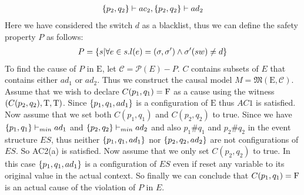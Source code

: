 \begin{example}
\begin{align*}
        \{p_2,q_2\} \vdash ac_2, \{p_2,q_2\} \vdash ad_2
    \end{align*}
    Here we have considered the switch $d$ as a blacklist, thus we can define the
    safety property $P$ as follows:
    \begin{align*}
        P = \{s|\forall e \in s. l(e) = (\sigma,\sigma')\wedge \sigma'(sw) \neq d\}
    \end{align*}
    To find the cause of $P$ in $\mathrm{E}$,
    let $\mathcal{C} = \mathcal{P}(E) - P$.
    $C$ contains subsets of $E$ that contains either $ad_1$ or $ad_2$.
    Thus we construct the causal model $M = \mathfrak{M}(\mathrm{E},\mathcal{C})$.
    Assume that we wish to declare $C(p_1,q_1) = \mathrm{F}$ as a cause using the witness
    $(C(p_2,q_2),\mathrm{T},\mathrm{T})$.
    Since $\{p_1,q_1,ad_1\}$ is a configuration of $\mathrm{E}$ thus
    $AC1$ is satisfied.
    Now assume that we set both $C(p_1,q_1)$ and $C(p_2,q_2)$ to true.
    Since we have $\{p_1,q_1\} \vdash_{min} ad_1$ and
    $\{p_2,q_2\} \vdash_{min} ad_2$ and also $p_1\#q_1$ and $p_2\#q_2$ in the
    event structure $ES$, thus neither $\{p_1,q_1,ad_1\}$ nor $\{p_2,q_2,ad_2\}$
    are not configurations of $ES$.
    So AC2(a) is satisfied.
    Now assume that we only set $C(p_2,q_2)$ to true.
    In this case $\{p_1,q_1,ad_1\}$ is a configuration of $ES$ even if reset any
    variable to its original value in the actual context.
    So finally we can conclude that $C(p_1,q_1) = \mathrm{F}$ is an actual cause of the
    violation of $P$ in $E$.
\end{example}